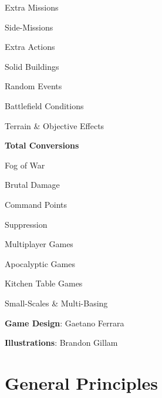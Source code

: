 \documentclass[9pt, a4paper, bookmarks=false]{extarticle}            %
\begin{document}
\begin{multicols}{2}
\hspace{1cm}Extra Missions 

\hspace{1cm}Side-Missions 

\hspace{1cm}Extra Actions 

\hspace{1cm}Solid Buildings 

\hspace{1cm}Random Events 

\hspace{1cm}Battlefield Conditions 

\hspace{1cm}Terrain \& Objective Effects 

\textbf{Total Conversions} 

\hspace{1cm}Fog of War 

\hspace{1cm}Brutal Damage 

\hspace{1cm}Command Points 

\hspace{1cm}Suppression 

\hspace{1cm}Multiplayer Games 

\hspace{1cm}Apocalyptic Games 

\hspace{1cm}Kitchen Table Games 

\hspace{1cm}Small-Scales \& Multi-Basing 

\end{multicols}

\vfill
\textbf{Game Design}: Gaetano Ferrara

\textbf{Illustrations}: Brandon Gillam

\newpage



\section{General Principles}
\end{document}

